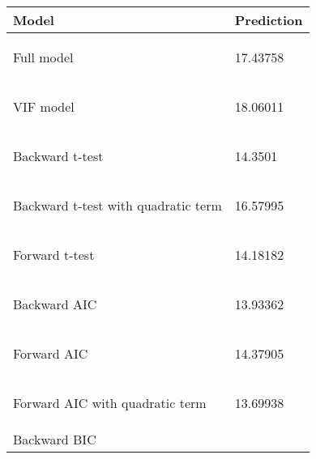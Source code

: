 \documentclass[a4paper]{article}
\begin{document}
\begin{longtable}{ l | p{10cm} }
\textbf{Model} & \textbf{Prediction} \\
\hline 
Full model &
\begin{Schunk}
\begin{Soutput}
17.43758
\end{Soutput}
\end{Schunk}
\\
VIF model &
\begin{Schunk}
\begin{Soutput}
18.06011
\end{Soutput}
\end{Schunk}
\\
Backward t-test &
\begin{Schunk}
\begin{Soutput}
14.3501
\end{Soutput}
\end{Schunk}
\\
Backward t-test with quadratic term &
\begin{Schunk}
\begin{Soutput}
16.57995
\end{Soutput}
\end{Schunk}
\\
Forward t-test &
\begin{Schunk}
\begin{Soutput}
14.18182
\end{Soutput}
\end{Schunk}
\\
Backward AIC &
\begin{Schunk}
\begin{Soutput}
13.93362
\end{Soutput}
\end{Schunk}
\\
Forward AIC &
\begin{Schunk}
\begin{Soutput}
14.37905
\end{Soutput}
\end{Schunk}
\\
Forward AIC with quadratic term&
\begin{Schunk}
\begin{Soutput}
13.69938
\end{Soutput}
\end{Schunk}
\\
Backward BIC &
\begin{Schunk}
\begin{Soutput}

\end{Soutput}
\end{Schunk}
\end{longtable}
\end{document}
